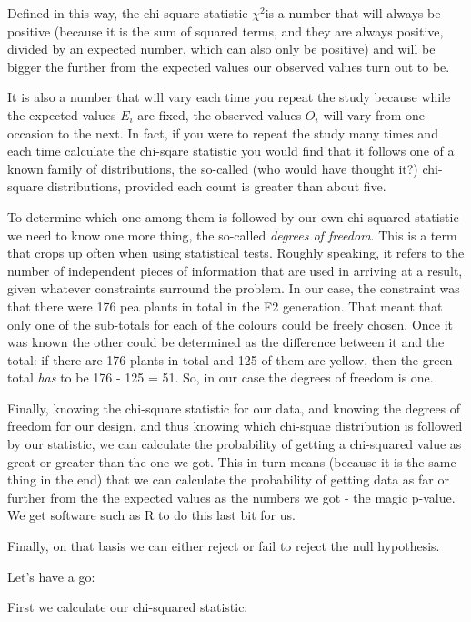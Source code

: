 \documentclass[
  letterpaper,
  DIV=11,
  numbers=noendperiod]{scrreprt}
\begin{document}
Defined in this way, the chi-square statistic \(\chi^2\)is a number that
will always be positive (because it is the sum of squared terms, and
they are always positive, divided by an expected number, which can also
only be positive) and will be bigger the further from the expected
values our observed values turn out to be.

It is also a number that will vary each time you repeat the study
because while the expected values \(E_i\) are fixed, the observed values
\(O_i\) will vary from one occasion to the next. In fact, if you were to
repeat the study many times and each time calculate the chi-sqare
statistic you would find that it follows one of a known family of
distributions, the so-called (who would have thought it?) chi-square
distributions, provided each count is greater than about five.

To determine which one among them is followed by our own chi-squared
statistic we need to know one more thing, the so-called \emph{degrees of
freedom}. This is a term that crops up often when using statistical
tests. Roughly speaking, it refers to the number of independent pieces
of information that are used in arriving at a result, given whatever
constraints surround the problem. In our case, the constraint was that
there were 176 pea plants in total in the F2 generation. That meant that
only one of the sub-totals for each of the colours could be freely
chosen. Once it was known the other could be determined as the
difference between it and the total: if there are 176 plants in total
and 125 of them are yellow, then the green total \emph{has} to be 176 -
125 = 51. So, in our case the degrees of freedom is one.

Finally, knowing the chi-square statistic for our data, and knowing the
degrees of freedom for our design, and thus knowing which chi-squae
distribution is followed by our statistic, we can calculate the
probability of getting a chi-squared value as great or greater than the
one we got. This in turn means (because it is the same thing in the end)
that we can calculate the probability of getting data as far or further
from the the expected values as the numbers we got - the magic p-value.
We get software such as R to do this last bit for us.

Finally, on that basis we can either reject or fail to reject the null
hypothesis.

Let's have a go:

First we calculate our chi-squared statistic:
\end{document}
